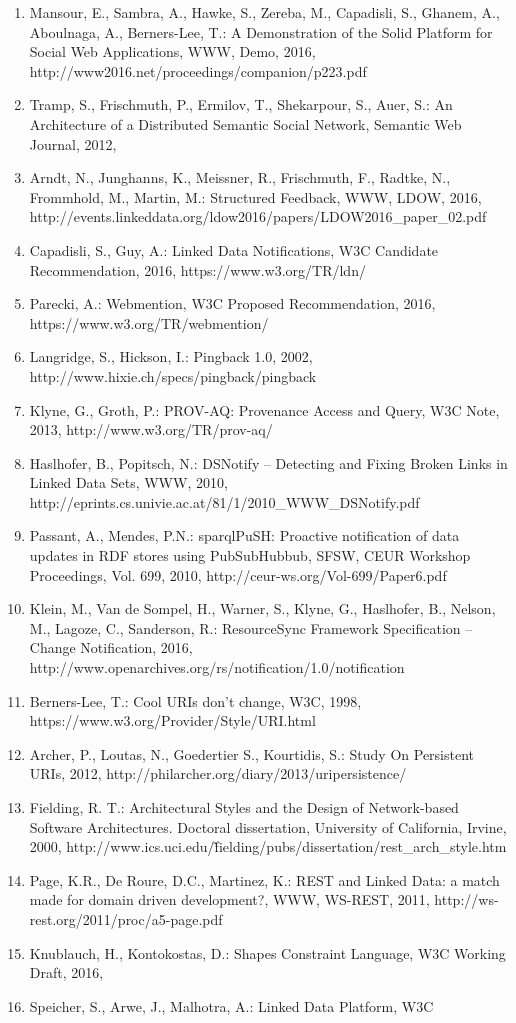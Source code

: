 \documentclass[a4paper]{llncs}
\begin{document}
                            \begin{enumerate}
  \item Mansour, E., Sambra, A., Hawke, S., Zereba, M., Capadisli, S., Ghanem, A., Aboulnaga, A., Berners-Lee, T.: A Demonstration of the Solid Platform for Social Web Applications, WWW, Demo, 2016, \empty http://www2016.net/proceedings/companion/p223.pdf\item Tramp, S., Frischmuth, P., Ermilov, T., Shekarpour, S., Auer, S.: An Architecture of a Distributed Semantic Social Network, Semantic Web Journal, 2012, \empty \item Arndt, N., Junghanns, K., Meissner, R., Frischmuth, F., Radtke, N., Frommhold, M., Martin, M.: Structured Feedback, WWW, LDOW, 2016, \empty http://events.linkeddata.org/ldow2016/papers/LDOW2016\_paper\_02.pdf\item Capadisli, S., Guy, A.: Linked Data Notifications, W3C Candidate Recommendation, 2016, \empty https://www.w3.org/TR/ldn/\item Parecki, A.: Webmention, W3C Proposed Recommendation, 2016, \empty https://www.w3.org/TR/webmention/\item Langridge, S., Hickson, I.: Pingback 1.0, 2002, \empty http://www.hixie.ch/specs/pingback/pingback\item Klyne, G., Groth, P.: PROV-AQ: Provenance Access and Query,  W3C Note, 2013, \empty http://www.w3.org/TR/prov-aq/\item Haslhofer, B., Popitsch, N.: DSNotify – Detecting and Fixing Broken Links in Linked Data Sets, WWW, 2010, \empty http://eprints.cs.univie.ac.at/81/1/2010\_WWW\_DSNotify.pdf\item Passant, A., Mendes, P.N.: sparqlPuSH: Proactive notification of data updates in RDF stores using PubSubHubbub, SFSW, CEUR Workshop Proceedings, Vol. 699, 2010, \empty http://ceur-ws.org/Vol-699/Paper6.pdf\item Klein, M., Van de Sompel, H., Warner, S., Klyne, G., Haslhofer, B., Nelson, M., Lagoze, C., Sanderson, R.: ResourceSync Framework Specification – Change Notification, 2016, \empty http://www.openarchives.org/rs/notification/1.0/notification\item Berners-Lee, T.: Cool URIs don't change, W3C, 1998, \empty https://www.w3.org/Provider/Style/URI.html\item Archer, P., Loutas, N., Goedertier S., Kourtidis, S.: Study On Persistent URIs, 2012, \empty http://philarcher.org/diary/2013/uripersistence/\item Fielding, R. T.: Architectural Styles and the Design of Network-based Software Architectures. Doctoral dissertation, University of California, Irvine, 2000, \empty http://www.ics.uci.edu/\~fielding/pubs/dissertation/rest\_arch\_style.htm\item Page, K.R., De Roure, D.C., Martinez, K.: REST and Linked Data: a match made for domain driven development?, WWW, WS-REST, 2011, \empty http://ws-rest.org/2011/proc/a5-page.pdf\item Knublauch, H., Kontokostas, D.: Shapes Constraint Language, W3C Working Draft, 2016, \empty \item Speicher, S., Arwe, J., Malhotra, A.: Linked Data Platform, W3C 
\end{enumerate}
\end{document}
